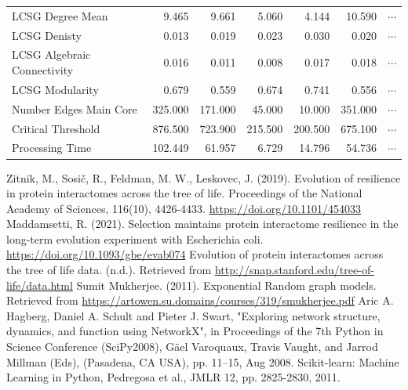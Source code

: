 \documentclass[12pt]{article}
\begin{document}
\begin{table}[H]
\begin{tabular}{lrrrrrr}
LCSG Degree Mean            &      9.465 &      9.661 &    5.060 &    4.144 &     10.590 & $\cdots$\\
LCSG Denisty                &      0.013 &      0.019 &    0.023 &    0.030 &      0.020 & $\cdots$\\
LCSG Algebraic Connectivity &      0.016 &      0.011 &    0.008 &    0.017 &      0.018 & $\cdots$\\
LCSG Modularity             &      0.679 &      0.559 &    0.674 &    0.741 &      0.556 & $\cdots$\\
Number Edges Main Core      &    325.000 &    171.000 &   45.000 &   10.000 &    351.000 & $\cdots$\\
Critical Threshold          &    876.500 &    723.900 &  215.500 &  200.500 &    675.100 & $\cdots$\\
Processing Time             &    102.449 &     61.957 &    6.729 &   14.796 &     54.736 & $\cdots$\\
\bottomrule
\end{tabular}
\end{table} \newpage
\begin{thebibliography}{1}
  Zitnik, M., Sosič, R., Feldman, M. W., Leskovec, J. (2019). Evolution of resilience in protein interactomes across the tree of life. Proceedings of the National Academy of Sciences, 116(10), 4426-4433. \url{https://doi.org/10.1101/454033}
 Maddamsetti, R. (2021). Selection maintains protein interactome resilience in the long-term evolution experiment with Escherichia coli. \url{https://doi.org/10.1093/gbe/evab074}
 Evolution of protein interactomes across the tree of life data. (n.d.). Retrieved from \url{http://snap.stanford.edu/tree-of-life/data.html}
 Sumit Mukherjee. (2011). Exponential Random graph models. Retrieved from \url{https://artowen.su.domains/courses/319/smukherjee.pdf}
 Aric A. Hagberg, Daniel A. Schult and Pieter J. Swart, "Exploring network structure, dynamics, and function using NetworkX", in Proceedings of the 7th Python in Science Conference (SciPy2008), Gäel Varoquaux, Travis Vaught, and Jarrod Millman (Eds), (Pasadena, CA USA), pp. 11–15, Aug 2008.
 Scikit-learn: Machine Learning in Python, Pedregosa et al., JMLR 12, pp. 2825-2830, 2011.
 
\end{thebibliography}

\end{document}
